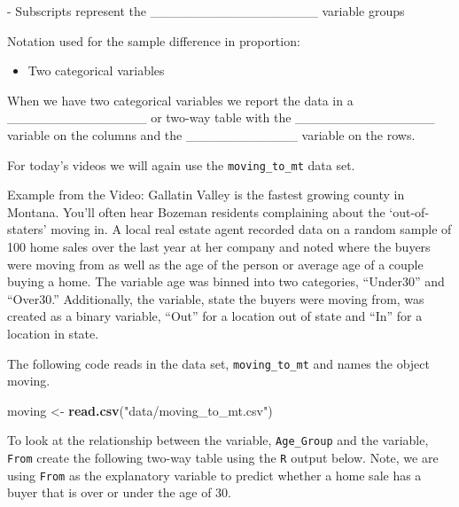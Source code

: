 \documentclass[
]{report}
\newenvironment{Shaded}{\begin{snugshade}}{\end{snugshade}}
\newcommand{\FunctionTok}[1]{\textcolor[rgb]{0.13,0.29,0.53}{\textbf{#1}}}
\newcommand{\NormalTok}[1]{#1}
\newcommand{\OtherTok}[1]{\textcolor[rgb]{0.56,0.35,0.01}{#1}}
\newcommand{\StringTok}[1]{\textcolor[rgb]{0.31,0.60,0.02}{#1}}
\providecommand{\tightlist}{%
  \setlength{\itemsep}{0pt}\setlength{\parskip}{0pt}}
\newcommand{\rgi}{\hspace{24pt}}  %
\begin{document}
\rgi \rgi - Subscripts represent the \_\_\_\_\_\_\_\_\_\_\_\_\_\_\_\_\_\_ variable groups

Notation used for the sample difference in proportion:

\begin{itemize}
\tightlist
\item
  Two categorical variables
\end{itemize}

\vspace{0.2in}

When we have two categorical variables we report the data in a \_\_\_\_\_\_\_\_\_\_\_\_\_\_\_ or two-way table with the \_\_\_\_\_\_\_\_\_\_\_\_\_\_\_ variable on the columns and the \_\_\_\_\_\_\_\_\_\_\_\_ variable on the rows.


\vspace{2mm}

For today's videos we will again use the \texttt{moving\_to\_mt} data set.

Example from the Video: Gallatin Valley is the fastest growing county in Montana. You'll often hear Bozeman residents complaining about the `out-of-staters' moving in. A local real estate agent recorded data on a random sample of 100 home sales over the last year at her company and noted where the buyers were moving from as well as the age of the person or average age of a couple buying a home. The variable age was binned into two categories, ``Under30'' and ``Over30.'' Additionally, the variable, state the buyers were moving from, was created as a binary variable, ``Out'' for a location out of state and ``In'' for a location in state.

The following code reads in the data set, \texttt{moving\_to\_mt} and names the object moving.

\begin{Shaded}
\begin{Highlighting}[]
\NormalTok{moving }\OtherTok{\textless{}{-}} \FunctionTok{read.csv}\NormalTok{(}\StringTok{"data/moving\_to\_mt.csv"}\NormalTok{)}
\end{Highlighting}
\end{Shaded}

To look at the relationship between the variable, \texttt{Age\_Group} and the variable, \texttt{From} create the following two-way table using the \texttt{R} output below. Note, we are using \texttt{From} as the explanatory variable to predict whether a home sale has a buyer that is over or under the age of 30.
\end{document}
